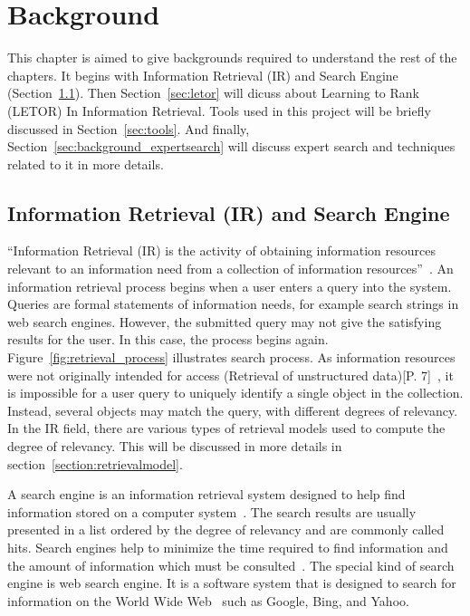 
\chapter{Background}\label{section:background}
This chapter is aimed to give backgrounds required to understand the rest of the chapters. It begins with Information Retrieval (IR) and Search Engine (Section~\ref{section:IR}).
Then Section~\ref{sec:letor} will dicuss about Learning to Rank (LETOR) In Information Retrieval. Tools used in this project will be briefly discussed in
Section~\ref{sec:tools}. And finally, Section~\ref{sec:background_expertsearch} will discuss expert search and techniques related to it in more 
details.

\section{Information Retrieval (IR) and Search Engine}\label{section:IR}
``Information Retrieval (IR) is the activity of obtaining information resources relevant to an information need from a collection of information resources''~\cite{IR}. 
An information retrieval process begins when a user 
enters a query into the system. Queries are formal statements of information needs, for example search strings in web search engines. However, the 
submitted query may not give the satisfying results for the user. In this case, the process begins again. Figure~\ref{fig:retrieval_process} illustrates
search process. As information resources were not originally intended for access (Retrieval of unstructured data)[P. 7]~\cite{IRlecture}, 
it is impossible for a user query to uniquely identify a single object in the collection. Instead, several objects may match the query, 
with different degrees of relevancy. In the IR field, there are various types of retrieval models used to compute the degree of relevancy. This will
be discussed in more details in section~\ref{section:retrievalmodel}.

A search engine is an information retrieval system designed to help find information stored on a computer system~\cite{searchengine}. The search results are usually 
presented in a list ordered by the degree of relevancy and are commonly called hits. 
Search engines help to minimize the time required to find information and the amount of 
information which must be consulted~\cite{searchengine}. The special kind of search engine is 
web search engine. It is a software system that is designed to search for information on the World Wide Web~\cite{websearchengine} such as Google, 
Bing, and Yahoo.

